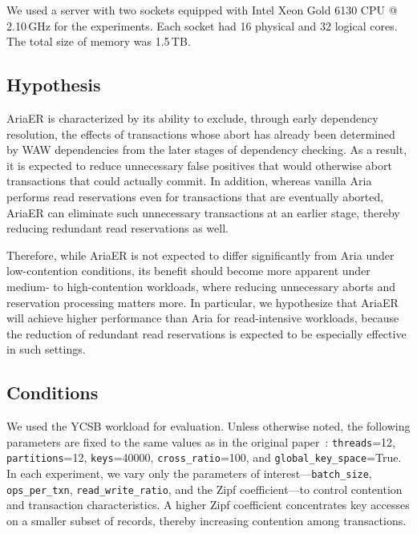 \documentclass[english,preprint,JIP]{ipsj}
\begin{document}
We used a server with two sockets equipped with Intel Xeon Gold 6130 CPU @ 2.10\,GHz for the experiments. Each socket had 16 physical and 32 logical cores. The total size of memory was 1.5\,TB.
\subsection{Hypothesis}

AriaER is characterized by its ability to exclude, through early dependency resolution, the effects of transactions whose abort has already been determined by WAW dependencies from the later stages of dependency checking. As a result, it is expected to reduce unnecessary false positives that would otherwise abort transactions that could actually commit. In addition, whereas vanilla Aria performs read reservations even for transactions that are eventually aborted, AriaER can eliminate such unnecessary transactions at an earlier stage, thereby reducing redundant read reservations as well.

Therefore, while AriaER is not expected to differ significantly from Aria under low-contention conditions, its benefit should become more apparent under medium- to high-contention workloads, where reducing unnecessary aborts and reservation processing matters more. In particular, we hypothesize that AriaER will achieve higher performance than Aria for read-intensive workloads, because the reduction of redundant read reservations is expected to be especially effective in such settings.

\subsection{Conditions}

We used the YCSB workload for evaluation. Unless otherwise noted, the following parameters are fixed to the same values as in the original paper~\cite{lu2020aria}: \texttt{threads}=12, \texttt{partitions}=12, \texttt{keys}=40000, \texttt{cross\_ratio}=100, and \texttt{global\_key\_space}=True. In each experiment, we vary only the parameters of interest---\texttt{batch\_size}, \texttt{ops\_per\_txn}, \texttt{read\_write\_ratio}, and the Zipf coefficient---to control contention and transaction characteristics. A higher Zipf coefficient concentrates key accesses on a smaller subset of records, thereby increasing contention among transactions.
\end{document}
